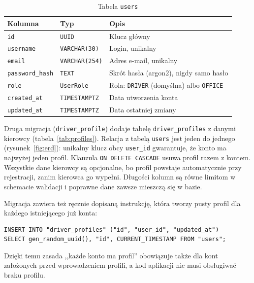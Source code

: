 \begin{table}[htbp]
\centering
\caption{Tabela \texttt{users}}
\label{tab:users}
\small
\begin{tabular}{|l|l|p{}|}
\hline
\textbf{Kolumna} & \textbf{Typ} & \textbf{Opis} \\
\hline
\texttt{id} & \texttt{UUID} & Klucz główny \\
\hline
\texttt{username} & \texttt{VARCHAR(30)} & Login, unikalny \\
\hline
\texttt{email} & \texttt{VARCHAR(254)} & Adres e-mail, unikalny \\
\hline
\texttt{password\_hash} & \texttt{TEXT} & Skrót hasła (argon2), nigdy samo hasło \\
\hline
\texttt{role} & \texttt{UserRole} & Rola: \texttt{DRIVER} (domyślna) albo \texttt{OFFICE} \\
\hline
\texttt{created\_at} & \texttt{TIMESTAMPTZ} & Data utworzenia konta \\
\hline
\texttt{updated\_at} & \texttt{TIMESTAMPTZ} & Data ostatniej zmiany \\
\hline
\end{tabular}
\par
{}
\end{table}

Druga migracja (\texttt{driver\_profile}) dodaje tabelę
\texttt{driver\_profiles} z danymi kierowcy (tabela~\ref{tab:profiles}).
Relacja z tabelą \texttt{users} jest jeden do jednego
(rysunek~\ref{fig:erd}): unikalny klucz obcy \texttt{user\_id} gwarantuje, że
konto ma najwyżej jeden profil. Klauzula \texttt{ON DELETE CASCADE} usuwa profil
razem z kontem. Wszystkie dane kierowcy są opcjonalne, bo profil powstaje
automatycznie przy rejestracji, zanim kierowca go wypełni. Długości kolumn są
równe limitom w schemacie walidacji i poprawne dane zawsze mieszczą się
w bazie.

Migracja zawiera też ręcznie dopisaną instrukcję, która tworzy pusty profil dla
każdego istniejącego już konta:

\begin{small}
\begin{verbatim}
INSERT INTO "driver_profiles" ("id", "user_id", "updated_at")
SELECT gen_random_uuid(), "id", CURRENT_TIMESTAMP FROM "users";
\end{verbatim}
\end{small}

\noindent Dzięki temu zasada ,,każde konto ma profil'' obowiązuje także dla kont
założonych przed wprowadzeniem profili, a kod aplikacji nie musi obsługiwać
braku profilu.

